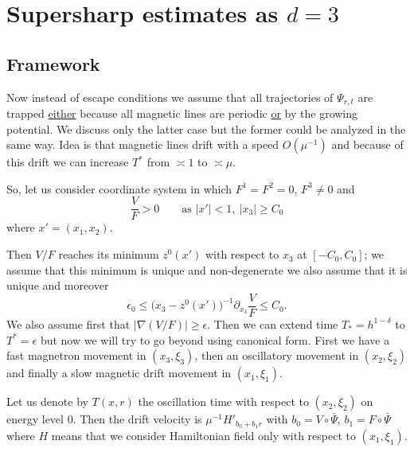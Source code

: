 \documentclass[12pt,oneside,openany,article]{memoir}
\numberwithin{equation}{chapter}
\theoremstyle{plain}
\theoremstyle{definition}
\theoremstyle{remark}
\numberwithin{equation}{chapter}
\newcounter{note}
\begin{document}
\chapter{Supersharp estimates as $d=3$}
\label{sect-13-6-3}

\section{Framework}
\label{sect-13-6-3-1}

Now instead of escape conditions we assume that all trajectories of $\Psi_{r,t}$ are trapped \underline{either} because all magnetic lines are periodic \underline{or} by the growing potential. We discuss only the latter case but the former could be analyzed in the same way. Idea is that magnetic lines drift with a speed $O(\mu^{-1})$ and because of this drift we can increase $T^*$ from $\asymp 1$ to $\asymp \mu$.

So, let us consider coordinate system in which $F^1=F^2=0$, $F^3\ne 0$ and
\begin{equation}
\frac{V}{F} > 0\qquad\text{as\ \ } |x'| <1, \ |x_3|\ge C_0
\label{13-6-89}
\end{equation}
where $x'=(x_1,x_2)$.

Then $V/F$ reaches its minimum $z^0(x')$ with respect to $x_3$ at $[-C_0,C_0]$; we assume that this minimum is unique and non-degenerate we also assume that it is unique and moreover
\begin{equation}
\epsilon_0 \le \bigl(x_3- z^0(x')\bigr)^{-1}\partial_{x_3}\frac{V}{F} \le C_0.
\label{13-6-90}
\end{equation}
We also assume first that $|\nabla (V/F)|\ge \epsilon$. Then we can extend time $T_*=h^{1-\delta}$ to $T^*=\epsilon$ but now we will try to go beyond using canonical form. First we have a fast magnetron movement in $(x_3,\xi_3)$, then an oscillatory movement in $(x_2,\xi_2)$ and finally a slow magnetic drift movement in $(x_1,\xi_1)$.

Let us denote by $T(x,r)$ the oscillation time with respect to $(x_2,\xi_2)$ on energy level $0$. Then the drift velocity is $\mu^{-1}H'_{b_0+b_1r}$ with $b_0=V\circ \bar{\Psi}$, $b_1=F\circ \bar{\Psi}$ where $H$ means that we consider Hamiltonian field only with respect to $(x_1,\xi_1)$.
\end{document}
